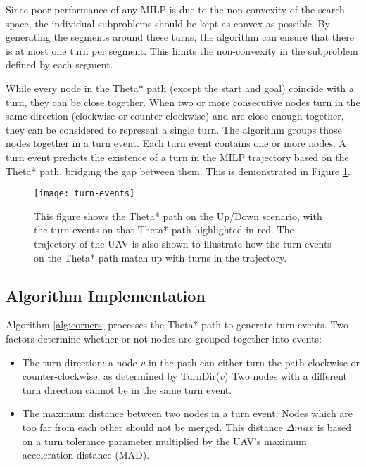 \par
Since poor performance of any MILP is due to the non-convexity of the search space, the individual subproblems should be kept as convex as possible. By generating the segments around these turns, the algorithm can ensure that there is at most one turn per segment. This limits the non-convexity in the subproblem defined by each segment.
\par
While every node in the Theta* path (except the start and goal) coincide with a turn, they can be close together. When two or more consecutive nodes turn in the same direction (clockwise or counter-clockwise) and are close enough together, they can be considered to represent a single turn. The algorithm groups those nodes together in a turn event. Each turn event contains one or more nodes. A turn event predicts the existence of a turn in the MILP trajectory based on the   Theta* path, bridging the gap between them. This is demonstrated in Figure \ref{fig:turn-events}.

\begin{figure}
\centering
\texttt{[image: turn-events]}
\caption[A visualization of turn events]{This figure shows the Theta* path on the Up/Down scenario, with the turn events on that Theta* path highlighted in red. The trajectory of the UAV is also shown to illustrate how the turn events on the Theta* path match up with turns in the trajectory.}
\label{fig:turn-events}
\end{figure}

\subsection{Algorithm Implementation}
Algorithm \ref{alg:corners} processes the Theta* path to generate turn events. Two factors determine whether or not nodes are grouped together into events:
\begin{itemize}
\item The turn direction: a node $v$ in the path can either turn the path clockwise or counter-clockwise, as determined by TurnDir($v$) Two nodes with a different turn direction cannot be in the same turn event.
\item The maximum distance between two nodes in a turn event: Nodes which are too far from each other should not be merged. This distance $\Delta max$ is based on a turn tolerance parameter multiplied by the UAV's maximum acceleration distance (MAD). 
\end{itemize}



